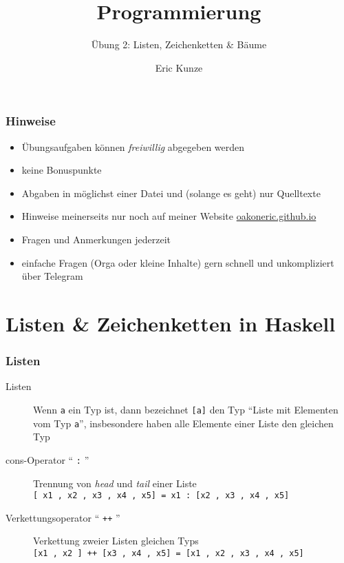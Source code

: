 \documentclass{beamer}
\begin{document}
	
	\title{Programmierung}
	\subtitle{Übung 2: Listen, Zeichenketten \& Bäume}
	\author{Eric Kunze}
	\date{}
	
	\maketitle
	
	

	\begin{frame} \frametitle{Hinweise}
		
		\begin{itemize}
			\item Übungsaufgaben können \textit{freiwillig} abgegeben werden
			\item keine Bonuspunkte
			\item Abgaben in möglichst einer Datei und (solange es geht) nur Quelltexte
			
			\bigskip
			
			\item Hinweise meinerseits nur noch auf meiner Website \url{oakoneric.github.io}
			\item Fragen und Anmerkungen jederzeit
			\item einfache Fragen (Orga oder kleine Inhalte) gern schnell und unkompliziert über Telegram
		\end{itemize}
		\centering {}
	\end{frame}



\section{Listen \& Zeichenketten in Haskell}
	\begin{frame}[fragile] \frametitle{Listen}
		\begin{description}
			\item[Listen] Wenn \texttt{a} ein Typ ist, dann bezeichnet \texttt{[a]} den Typ ``Liste mit Elementen vom Typ \texttt{a}'', insbesondere
			haben alle Elemente einer Liste den gleichen Typ
			\pause
			\item[cons-Operator `` \texttt{:} '']  Trennung von \textit{head} und \textit{tail} einer Liste \\
			\lstinline{[ x1 , x2 , x3 , x4 , x5] = x1 : [x2 , x3 , x4 , x5]}
			\bigskip \pause
			\item[Verkettungsoperator `` \texttt{++} ''] Verkettung zweier Listen gleichen Typs \\
			\lstinline{[x1 , x2 ] ++ [x3 , x4 , x5] = [x1 , x2 , x3 , x4 , x5]}
		\end{description}
	\end{frame}
\end{document}
